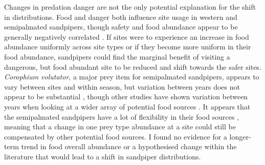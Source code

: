 Changes in predation danger are not the only potential explanation for the shift in distributions. Food and danger both influence site usage in western and semipalmated sandpipers, though safety and food abundance appear to be generally negatively correlated \citep{Pomeroy2008a,Sprague2008a}. If sites were to experience an increase in food abundance uniformly across site types or if they become more uniform in their food abundance, sandpipers could find the marginal benefit of visiting a dangerous, but food abundant site to be reduced and shift towards the safer sites. \textit{Corophium volutator}, a major prey item for semipalmated sandpipers, appears to vary between sites and within season, but variation between years does not appear to be substantial \citep{Barbeau2009a}, though other studies have shown variation between years when looking at a wider array of potential food sources \citep{Quinn2012a}. It appears that the semipalmated sandpipers have a lot of flexibility in their food sources \citep{Quinn2017}, meaning that a change in one prey type abundance at a site could still be compensated by other potential food sources. I found no evidence for a longer-term trend in food overall abundance or a hypothesised change within the literature that would lead to a shift in sandpiper distributions. 

